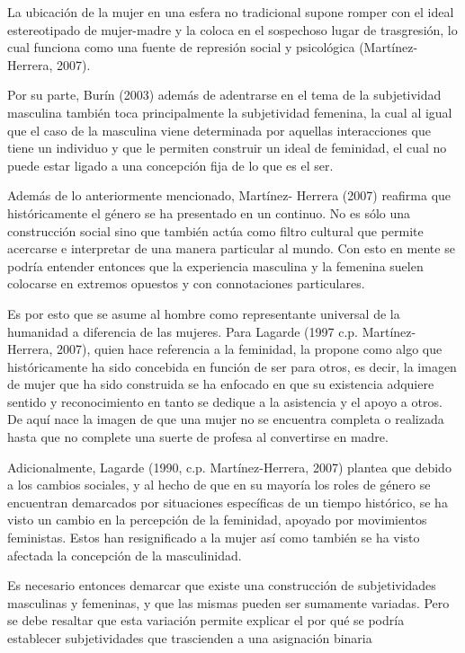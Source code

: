La ubicación de la mujer en una esfera no tradicional supone romper con el ideal
estereotipado de mujer-madre y la coloca en el sospechoso lugar de trasgresión,
lo cual funciona como una fuente de represión social y psicológica
(Martínez-Herrera, 2007).

Por su parte, Burín (2003) además de adentrarse en el tema de la subjetividad
masculina también toca principalmente la subjetividad femenina, la cual al igual
que el caso de la masculina viene determinada por aquellas interacciones que
tiene un individuo y que le permiten construir un ideal de feminidad, el cual no
puede estar ligado a una concepción fija de lo que es el ser.

Además de lo anteriormente mencionado, Martínez- Herrera (2007) reafirma que
históricamente el género se ha presentado en un continuo.
No es sólo una construcción social sino que también actúa como filtro cultural
que permite acercarse e interpretar de una manera particular al mundo.
Con esto en mente se podría entender entonces que la experiencia masculina y la
femenina suelen colocarse en extremos opuestos y con connotaciones particulares.

Es por esto que se asume al hombre como representante universal de la humanidad
a diferencia de las mujeres.
Para Lagarde (1997 c.p. Martínez-Herrera, 2007), quien hace referencia a la
feminidad, la propone como algo que históricamente ha sido concebida en función
de ser para otros, es decir, la imagen de mujer que ha sido construida se ha
enfocado en que su existencia adquiere sentido y reconocimiento en tanto se
dedique a la asistencia y el apoyo a otros.
De aquí nace la imagen de que una mujer no se encuentra completa o realizada
hasta que no complete una suerte de profesa al convertirse en madre.

Adicionalmente, Lagarde (1990, c.p. Martínez-Herrera, 2007) plantea que
debido a los cambios sociales, y al hecho de que en su mayoría los roles de
género se encuentran demarcados por situaciones específicas de un tiempo
histórico, se ha visto un cambio en la percepción de la feminidad, apoyado por
movimientos feministas.
Estos han resignificado a la mujer así como también se ha visto afectada la
concepción de la masculinidad.

Es necesario entonces demarcar que existe una construcción de subjetividades
masculinas y femeninas, y que las mismas pueden ser sumamente variadas.
Pero se debe resaltar que esta variación permite explicar el por qué se podría
establecer subjetividades que trascienden a una asignación binaria

